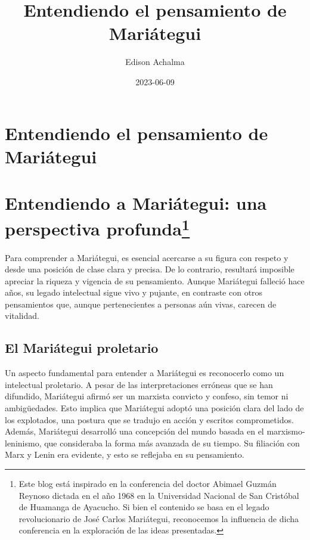 \documentclass[
  jou,
  floatsintext,
  longtable,
  a4paper,
  nolmodern,
  notxfonts,
  notimes,
  12pt,
  colorlinks=true,linkcolor=blue,citecolor=blue,urlcolor=blue]{apa7}
\title{Entendiendo el pensamiento de Mariátegui}
\author{Edison Achalma}
\affiliation{
{Escuela Profesional de Economía, Universidad Nacional de San Cristóbal
de Huamanga}}
\date{2023-06-09}
\begin{document}
\maketitle


\hypertarget{toc}{}
\tableofcontents
\newpage
\section[Introduction]{Entendiendo el pensamiento de Mariátegui}

\setcounter{secnumdepth}{3}

\setlength\LTleft{0pt}




\section[Entendiendo a Mariátegui: una perspectiva
profunda]{\texorpdfstring{Entendiendo a Mariátegui: una perspectiva
profunda\footnote{Este blog está inspirado en la conferencia del doctor
  Abimael Guzmán Reynoso dictada en el año 1968 en la Universidad
  Nacional de San Cristóbal de Huamanga de Ayacucho. Si bien el
  contenido se basa en el legado revolucionario de José Carlos
  Mariátegui, reconocemos la influencia de dicha conferencia en la
  exploración de las ideas presentadas.}}{Entendiendo a Mariátegui: una perspectiva profunda}}\label{entendiendo-a-mariuxe1tegui-una-perspectiva-profunda}

Para comprender a Mariátegui, es esencial acercarse a su figura con
respeto y desde una posición de clase clara y precisa. De lo contrario,
resultará imposible apreciar la riqueza y vigencia de su pensamiento.
Aunque Mariátegui falleció hace años, su legado intelectual sigue vivo y
pujante, en contraste con otros pensamientos que, aunque pertenecientes
a personas aún vivas, carecen de vitalidad.

\subsection{El Mariátegui proletario}\label{el-mariuxe1tegui-proletario}

Un aspecto fundamental para entender a Mariátegui es reconocerlo como un
intelectual proletario. A pesar de las interpretaciones erróneas que se
han difundido, Mariátegui afirmó ser un marxista convicto y confeso, sin
temor ni ambigüedades. Esto implica que Mariátegui adoptó una posición
clara del lado de los explotados, una postura que se tradujo en acción y
escritos comprometidos. Además, Mariátegui desarrolló una concepción del
mundo basada en el marxismo-leninismo, que consideraba la forma más
avanzada de su tiempo. Su filiación con Marx y Lenin era evidente, y
esto se reflejaba en su pensamiento.
\end{document}

